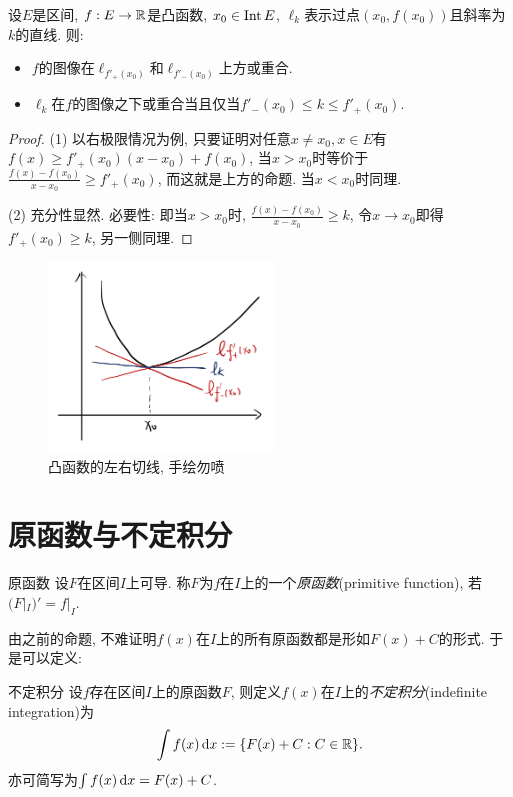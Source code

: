 \begin{proposition}{}
	设$E$是区间, $f:E \to \mathbb{R}$是凸函数, $x_0 \in \operatorname{Int} E$, $\ell _k$表示过点$(x_0,f(x_0))$且斜率为$k$的直线. 则: 
	\begin{itemize}
		\item $f$的图像在$\ell _{f'_+(x_0)}$和$\ell _{f'_-(x_0)}$上方或重合. 
		\item $\ell _k$在$f$的图像之下或重合当且仅当$f'_-(x_0) \leq k \leq f'_+(x_0)$. 
	\end{itemize}
\end{proposition}
\begin{proof}
	(1) 以右极限情况为例, 只要证明对任意$x\neq x_0,x \in E$有$f(x) \geq f'_+(x_0)(x-x_0)+f(x_0)$, 当$x>x_0$时等价于$\frac{f(x)-f(x_0)}{x-x_0} \geq f'_+(x_0)$, 而这就是上方的命题. 当$x<x_0$时同理. 
	
	(2) 充分性显然. 必要性: 即当$x>x_0$时, $\frac{f(x)-f(x_0)}{x-x_0} \geq k$, 令$x \to x_0$即得$f'_+(x_0) \geq k$, 另一侧同理. 
\end{proof}

\begin{figure}[H]
	\centering
	\includegraphics[width=6cm]{attachment/IMG_3552.jpg}
	\caption{凸函数的左右切线, 手绘勿喷}
\end{figure}

\newpage
\section{原函数与不定积分}

\begin{definition}{原函数}
	设$F$在区间$I$上可导. 称$F$为$f$在$I$上的一个\textit{原函数}(primitive function), 若$(F|_I)' = f|_I$. 
\end{definition}

由之前的命题, 不难证明$f(x)$在$I$上的所有原函数都是形如$F(x)+C$的形式. 于是可以定义:

\begin{definition}{不定积分}
	设$f$存在区间$I$上的原函数$F$, 则定义$f(x)$在$I$上的\textit{不定积分}(indefinite integration)为$$\int f(x) \mathop{}\!\mathrm{d} x := \{ F(x)+C:C \in \mathbb{R} \}.$$
	亦可简写为$\int f(x) \mathop{}\!\mathrm{d} x = F(x)+C$. 
\end{definition}

